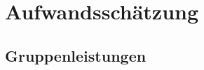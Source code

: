 \chapter{Aufwandsschätzung}\label{ch:aufwandsschatzung}
\newcommand{\trschaetzung}[3]{\rowcolor{lightgray}\multicolumn{1}{|l|}{\textbf{#1}} & \textbf{#2} \\* \multicolumn{2}{|l|}{\begin{tabular}[c]{@{}l@{}}#3\end{tabular}} \\ \hline}

\section{Gruppenleistungen}\label{sec:gruppenleistungen}


